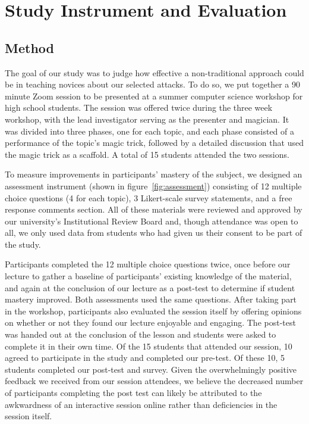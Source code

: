 \section{Study Instrument and Evaluation}
\label{SEC:evaluation}

\subsection{Method}

The goal of our study was to judge how effective a non-traditional approach
could be in teaching novices about our selected attacks.  To do so,
we put together a 90 minute Zoom session to be presented at a summer
computer science workshop for high school students.  The session was
offered twice during the three week workshop, with the lead investigator
serving as the presenter and magician.  It was divided into three phases,
one
for each topic,
and each phase consisted of a performance of the topic's magic
trick, followed by a detailed discussion that used the magic trick
as a scaffold.  A total of 15 students attended the two sessions.

To measure improvements in participants' mastery of the subject, we
designed an assessment instrument (shown in figure~\ref{fig:assessment})
consisting of
12 multiple choice questions (4 for each topic),
3 Likert-scale survey statements,
and a free response comments section.
All of these materials were reviewed and approved by our university's
Institutional Review Board and, though attendance was open to all, we only
used data from students who had given us their consent to be part of the
study.

Participants completed the 12 multiple choice questions twice,
once before our lecture to gather a baseline of
participants' existing knowledge of the material,
and again at the conclusion of our
lecture as a post-test to determine if student mastery improved.
Both assessments used the same questions.
After taking part in the workshop, participants also evaluated the session
itself by offering opinions on whether or not they found our lecture
enjoyable and engaging.
The post-test was handed out at the conclusion of the lesson
and students were asked
to complete it in their own time.
Of the 15 students that attended our session, 10 agreed to participate in
the study and completed our pre-test. Of these 10, 5
students completed our post-test and survey.  Given the overwhelmingly
positive feedback we received from our session attendees, we believe the
decreased number of participants completing the post test can likely
be attributed
to the awkwardness of an interactive session online
rather than deficiencies in
the session itself.


